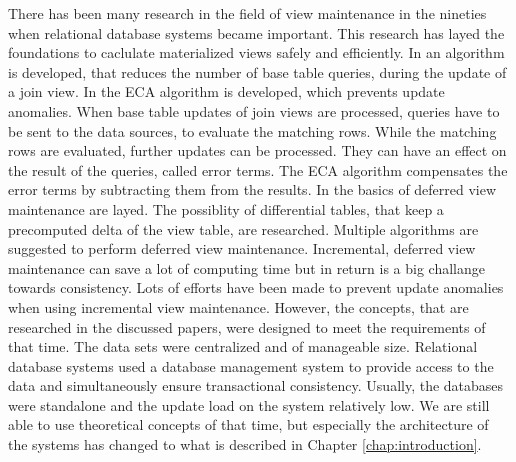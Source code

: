 \documentclass[11pt,a4paper,bibtotoc,idxtotoc,headsepline,footsepline,footexclude,BCOR12mm,DIV13]{scrbook}
\begin{document}
There has been many research in the field of view maintenance in the nineties when relational database systems became important\cite{blakeley:efficiently, gupta:maintaining, zhuge:view, colby:algorithms, wang:efficient}. This research has layed the foundations to caclulate materialized views safely and efficiently. In \cite{blakeley:efficiently} an algorithm is developed, that reduces the number of base table queries, during the update of a join view. In \cite{zhuge:view} the ECA algorithm is developed, which prevents update anomalies. When base table updates of join views are processed, queries have to be sent to the data sources, to evaluate the matching rows. While the matching rows are evaluated, further updates can be processed. They can have an effect on the result of the queries, called error terms. The ECA algorithm compensates the error terms by subtracting them from the results. In \cite{colby:algorithms} the basics of deferred view maintenance are layed. The possiblity of differential tables, that keep a precomputed delta of the view table, are researched. Multiple algorithms are suggested to perform deferred view maintenance. Incremental, deferred view maintenance can save a lot of computing time but in return is a big challange towards consistency. Lots of efforts have been made to prevent update anomalies when using incremental view maintenance\cite{gupta:maintaining, zhuge:view, salem:how}. However, the concepts, that are researched in the discussed papers, were designed to meet the requirements of that time. The data sets were centralized and of manageable size. Relational database systems used a database management system to provide access to the data and simultaneously ensure transactional consistency. Usually, the databases were standalone and the update load on the system relatively low. We are still able to use theoretical concepts of that time, but especially the architecture of the systems has changed to what is described in Chapter \ref{chap:introduction}.
\end{document}
